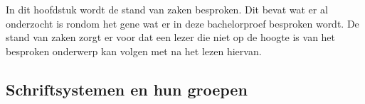 \chapter{}
\label{ch:stand-van-zaken}


In dit hoofdstuk wordt de stand van zaken besproken.
Dit bevat wat er al onderzocht is rondom het gene wat er in deze bachelorproef besproken wordt.
De stand van zaken zorgt er voor dat een lezer die niet op de hoogte is van het besproken onderwerp kan volgen met na het lezen hiervan.





\section{Schriftsystemen en hun groepen}

